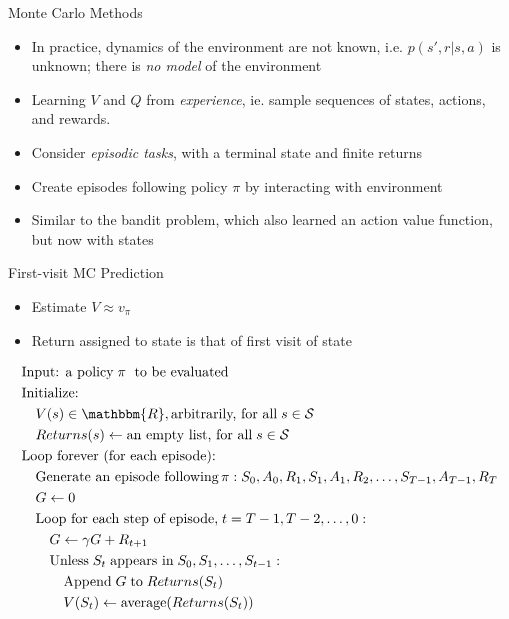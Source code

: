 \documentclass[ignorenonframetext,xcolor=x11names]{beamer}
\begin{document}
\begin{frame}{Monte Carlo Methods}
\begin{itemize}
   \item In practice, dynamics of the environment are not known, i.e. $p(s', r | s, a)$ is unknown; there is \emph{no model} of the environment
   \item Learning $V$ and $Q$ from \emph{experience}, ie. sample sequences of states, actions, and rewards. 
   \item Consider \emph{episodic tasks}, with a terminal state and finite returns
   \item Create episodes following policy $\pi$ by interacting with environment
   \item Similar to the bandit problem, which also learned an action value function, but now with states
\end{itemize}
\end{frame}

\begin{frame}{First-visit MC Prediction}
\begin{itemize}
   \item Estimate $V \approx v_{\pi}$
   \item Return assigned to state is that of first visit of state
\end{itemize}

\begin{block}{}
\footnotesize
\begin{align*}
& \text{Input: a policy}\;\pi\;\text{ to be evaluated} \\
& \text{Initialize:} \\
& \quad V(s) \in \mathbbm{R}, \text{arbitrarily, for all}\;s \in \mathcal{S} \\
& \quad Returns(s) \leftarrow \text{an empty list, for all}\; s \in \mathcal{S} \\
& \text{Loop forever (for each episode):}\\
& \quad \text{Generate an episode following}\, \pi: S_0, A_0, R_1, S_1, A_1, R_2, \ldots, S_{T-1}, A_{T-1}, R_{T} \\
& \quad G \leftarrow 0 \\
& \quad \text{Loop for each step of episode,}\; t = T-1, T-2, \ldots, 0: \\
& \quad \quad G \leftarrow \gamma G + R_{t+1} \\
& \quad \quad \text{Unless}\; S_t\; \text{appears in}\; S_0, S_1, \ldots, S_{t-1}: \\
& \quad \quad \quad \text{Append}\; G\; \text{to}\; Returns(S_t) \\
& \quad \quad \quad V(S_t) \leftarrow \operatorname{average}(Returns(S_t))
\end{align*}
\end{block}
\end{frame}
\end{document}
